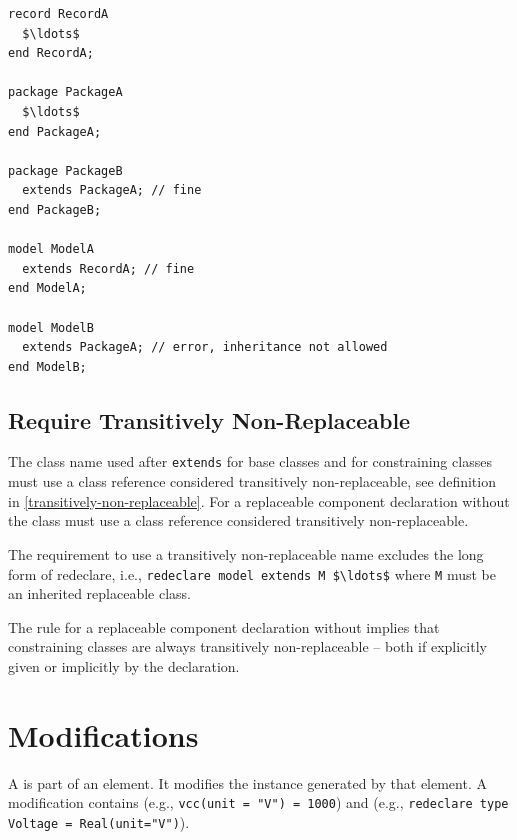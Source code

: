 \begin{example}
\begin{lstlisting}[language=modelica]
record RecordA
  $\ldots$
end RecordA;

package PackageA
  $\ldots$
end PackageA;

package PackageB
  extends PackageA; // fine
end PackageB;

model ModelA
  extends RecordA; // fine
end ModelA;

model ModelB
  extends PackageA; // error, inheritance not allowed
end ModelB;
\end{lstlisting}
\end{example}


\subsection{Require Transitively Non-Replaceable}\label{restrictions-on-base-classes-and-constraining-types-to-be-transitively-non-replaceable}\label{require-transitively-non-replaceable}

The class name used after \lstinline!extends! for base classes and for constraining classes must use a class reference considered transitively non-replaceable, see definition in \cref{transitively-non-replaceable}.
For a replaceable component declaration without  the class must use a class reference considered transitively non-replaceable.

\begin{nonnormative}
The requirement to use a transitively non-replaceable name excludes the long form of redeclare, i.e., \lstinline!redeclare model extends M $\ldots$! where \lstinline!M! must be an inherited replaceable class.
\end{nonnormative}

\begin{nonnormative}
The rule for a replaceable component declaration without  implies that constraining classes are always transitively non-replaceable -- both if explicitly given or implicitly by the declaration.
\end{nonnormative}


\section{Modifications}\label{modifications}

A  is part of an element.
It modifies the instance generated by that element.
A modification contains  (e.g., \lstinline!vcc(unit = "V") = 1000!) and  (e.g., \lstinline!redeclare type Voltage = Real(unit="V")!).

